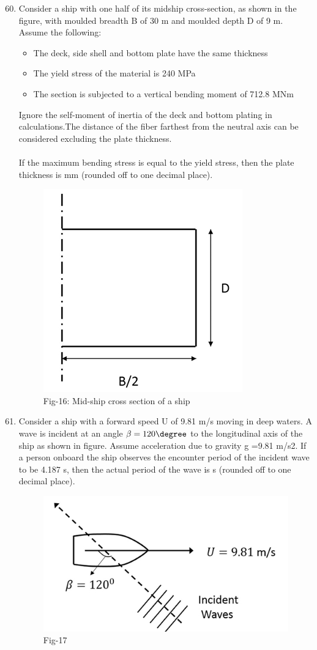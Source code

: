 \documentclass[journal]{IEEEtran}
\theoremstyle{remark}
\begin{document}
\begin{enumerate}[itemsep=1em]
\setcounter{enumi}{59}
\item Consider a ship with one half of its midship cross-section, as shown in the figure, with moulded breadth B of 30 m and moulded depth D of 9 m. \\ 
Assume the following: \\
\begin{itemize}[leftmargin=2.5em, labelsep=0.5em, itemsep=0.5em]
    \item The deck, side shell and bottom plate have the same thickness
    \item The yield stress of the material is 240 MPa
    \item The section is subjected to a vertical bending moment of 712.8 MNm
\end{itemize}

Ignore the self-moment of inertia of the deck and bottom plating in calculations.The distance of the fiber farthest from the neutral axis can be considered excluding the plate thickness. \\
\\
If the maximum bending stress is equal to the yield stress, then the plate thickness is \underline{\hspace{1cm}} mm (rounded off to one decimal place).

\begin{figure}[H]
    \centering
    \includegraphics[width=0.2\columnwidth]{figs/fig-16.jpeg}
    \caption*{Fig-16: Mid-ship cross section of a ship}
    \label{fig-16}
\end{figure}
\end{enumerate}
\newpage
\vspace*{0.25cm}

\begin{enumerate}[itemsep=1em]
\setcounter{enumi}{60}
\item Consider a ship with a forward speed U of  9.81 m/s moving in deep waters. A wave is incident at an angle $\beta=120\degree$ to the longitudinal axis of the ship as shown in figure. Assume acceleration due to gravity g =9.81 m/s2. If a person onboard the ship observes the encounter period of the incident wave to be 4.187 s, then the actual period of the wave is \underline{\hspace{1cm}} s (rounded off to one decimal place). 
\begin{figure}[H]
    \centering
    \includegraphics[width=0.2\columnwidth]{figs/fig-17.jpeg}
    \caption*{Fig-17}
    \label{fig-17}
\end{figure}
\end{enumerate}
\end{document}
